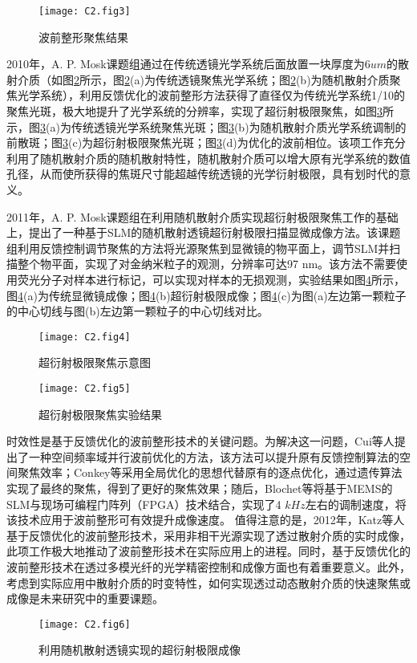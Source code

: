 \begin{figure}[htp]
	\centering
	\texttt{[image: C2.fig3]}
	\caption{波前整形聚焦结果}
	\label{fig2:3}
\end{figure}

2010年，A. P. Mosk\cite{vellekoop_exploiting_2010}课题组通过在传统透镜光学系统后面放置一块厚度为$6 um$的散射介质（如图\ref{fig2:4}所示，图\ref{fig2:4}(a)为传统透镜聚焦光学系统；图\ref{fig2:4}(b)为随机散射介质聚焦光学系统），利用反馈优化的波前整形方法获得了直径仅为传统光学系统1/10的聚焦光斑，极大地提升了光学系统的分辨率，实现了超衍射极限聚焦，如图\ref{fig2:5}所示\cite{vellekoop_exploiting_2010}，图\ref{fig2:5}(a)为传统透镜光学系统聚焦光斑；图\ref{fig2:5}(b)为随机散射介质光学系统调制的前散斑；图\ref{fig2:5}(c)为超衍射极限聚焦光斑；图\ref{fig2:5}(d)为优化的波前相位。该项工作充分利用了随机散射介质的随机散射特性，随机散射介质可以增大原有光学系统的数值孔径，从而使所获得的焦斑尺寸能超越传统透镜的光学衍射极限，具有划时代的意义。

2011年，A. P. Mosk\cite{van_putten_scattering_2011}课题组在利用随机散射介质实现超衍射极限聚焦工作的基础上，提出了一种基于SLM的随机散射透镜超衍射极限扫描显微成像方法。该课题组利用反馈控制调节聚焦的方法将光源聚焦到显微镜的物平面上，调节SLM并扫描整个物平面，实现了对金纳米粒子的观测，分辨率可达97 nm。该方法不需要使用荧光分子对样本进行标记，可以实现对样本的无损观测，实验结果如图\ref{fig2:6}所示\cite{van_putten_scattering_2011}，图\ref{fig2:6}(a)为传统显微镜成像；图\ref{fig2:6}(b)超衍射极限成像；图\ref{fig2:6}(c)为图(a)左边第一颗粒子的中心切线与图(b)左边第一颗粒子的中心切线对比。

\begin{figure}[htp]
	\centering
	\texttt{[image: C2.fig4]}
	\caption{超衍射极限聚焦示意图}
	\label{fig2:4}
\end{figure}

\begin{figure}[htp]
	\centering
	\texttt{[image: C2.fig5]}
	\caption{超衍射极限聚焦实验结果}
	\label{fig2:5}
\end{figure}

时效性是基于反馈优化的波前整形技术的关键问题。为解决这一问题，Cui等人\cite{cui_parallel_2011}提出了一种空间频率域并行波前优化的方法，该方法可以提升原有反馈控制算法的空间聚焦效率；Conkey等\cite{conkey_color_2012}采用全局优化的思想代替原有的逐点优化，通过遗传算法实现了最终的聚焦，得到了更好的聚焦效果；随后，Blochet等\cite{blochet_fast_2017}将基于MEMS的SLM与现场可编程门阵列（FPGA）技术结合，实现了4 $kHz$左右的调制速度，将该技术应用于波前整形可有效提升成像速度。
值得注意的是，2012年，Katz等人\cite{katz_looking_2012}基于反馈优化的波前整形技术，采用非相干光源实现了透过散射介质的实时成像，此项工作极大地推动了波前整形技术在实际应用上的进程。同时，基于反馈优化的波前整形技术在透过多模光纤的光学精密控制和成像方面也有着重要意义\cite{park_perspective_2018,lemoult_manipulating_2009,lerosey_focusing_2007}。此外，考虑到实际应用中散射介质的时变特性，如何实现透过动态散射介质的快速聚焦或成像是未来研究中的重要课题。
\begin{figure}[htp]
	\centering
	\texttt{[image: C2.fig6]}
	\caption{利用随机散射透镜实现的超衍射极限成像}
	\label{fig2:6}
\end{figure}

